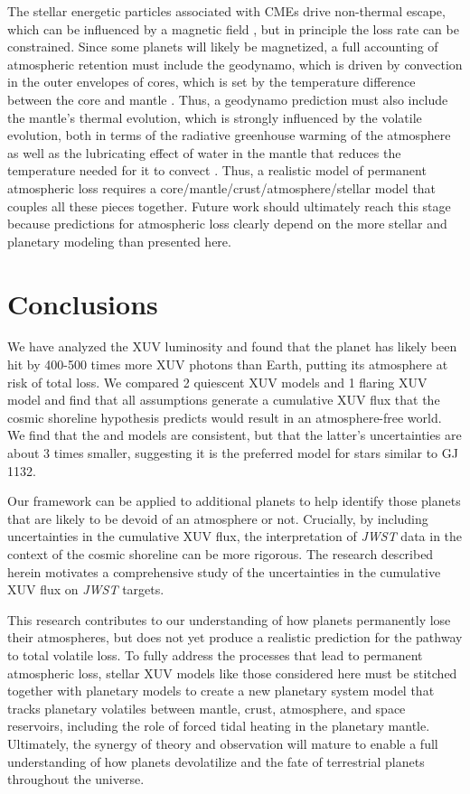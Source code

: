 \documentclass[preprint]{aastex631}
\def\jwst{{\it JWST}\xspace}
\begin{document}
The stellar energetic particles associated with CMEs drive non-thermal escape, which can be influenced by a magnetic field \citep{DriscollBercovici13,Gunell18}, but in principle the loss rate can be constrained. Since some planets will likely be magnetized, a full accounting of atmospheric retention must include the geodynamo, which is driven by convection in the outer envelopes of cores, which is set by the temperature difference between the core and mantle \citep{olson2006}. Thus, a geodynamo prediction must also include the mantle's thermal evolution, which is strongly influenced by the volatile evolution, both in terms of the radiative greenhouse warming of the atmosphere as well as the lubricating effect of water in the mantle that reduces the temperature needed for it to convect \citep{FoleyDriscoll16,McGovernSchubert89,Garcia25}. Thus, a realistic model of permanent atmospheric loss requires a core/mantle/crust/atmosphere/stellar model that couples all these pieces together. Future work should ultimately reach this stage because predictions for atmospheric loss clearly depend on the more stellar and planetary modeling than presented here. 

\section{Conclusions\label{sec:conclusions}}

We have analyzed the XUV luminosity and found that the planet has likely been hit by 400-500 times more XUV photons than Earth, putting its atmosphere at risk of total loss. We compared 2 quiescent XUV models and 1 flaring XUV model and find that all assumptions generate a cumulative XUV flux that the cosmic shoreline hypothesis predicts would result in an atmosphere-free world. We find that the \citet{Ribas05} and \citet{Engle24} models are consistent, but that the latter's uncertainties are about 3 times smaller, suggesting it is the preferred model for stars similar to GJ 1132.

Our framework can be applied to additional planets to help identify those planets that are likely to be devoid of an atmosphere or not. Crucially, by including uncertainties in the cumulative XUV flux, the interpretation of \jwst data in the context of the cosmic shoreline can be more rigorous. The research described herein motivates a comprehensive study of the uncertainties in the cumulative XUV flux on \jwst targets.

This research contributes to our understanding of how planets permanently lose their atmospheres, but does not yet produce a realistic prediction for the pathway to total volatile loss. To fully address the processes that lead to permanent atmospheric loss, stellar XUV models like those considered here must be stitched together with planetary models to create a new planetary system model that tracks planetary volatiles between mantle, crust, atmosphere, and space reservoirs, including the role of forced tidal heating in the planetary mantle. Ultimately, the synergy of theory and observation will mature to enable a full understanding of how planets devolatilize and the fate of terrestrial planets throughout the universe.
\end{document}
